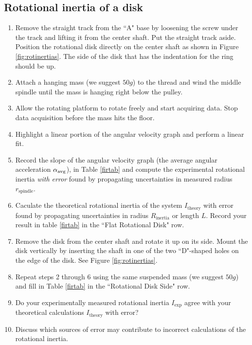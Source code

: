\subsection{Rotational inertia of a disk}

\label{diskinert}
\begin{enumerate}
	\item Remove the straight track from the ``A" base by loosening the screw under the track and lifting it from the center shaft.  Put the straight track aside.  Position the rotational disk directly on the center shaft as shown in Figure \ref{fig:rotinertias}.  The side of the disk that has the indentation for the ring should be up.
	\item Attach a hanging mass (we suggest $50g$) to the thread and wind the middle spindle until the mass is hanging right below the pulley.
	\item Allow the rotating platform to rotate freely and start acquiring data.  Stop data acquisition before the mass hits the floor.
	\item Highlight a linear portion of the angular velocity graph and perform a linear fit.
	\item Record the slope of the angular velocity graph (the average angular acceleration $\alpha _{\rm avg}$), in Table \ref{firtab} and compute the experimental rotational inertia {\it{with error}} found by propagating uncertainties in measured radius $r_\text{spindle}$.
\item Caculate the theoretical rotational inertia of the system $I_\text{theory}$ with error found by propagating uncertainties in radius $R_\text{inertia}$ or length $L$. Record your result in table \ref{firtab} in the ``Flat Rotational Disk" row.
	\item Remove the disk from the center shaft and rotate it up on its side.  Mount the disk vertically by inserting the shaft in one of the two ``D"-shaped holes on the edge of the disk.  See Figure \ref{fig:rotinertias}.
\item Repeat steps 2 through 6 using the same suspended mass (we suggest $50g$) and fill in Table \ref{firtab} in the ``Rotational Disk Side" row.
\item Do your experimentally measured rotational inertia $I_\text{exp}$ agree with your theoretical calculations $I_\text{theory}$ with error?
\item Discuss which sources of error may contribute to incorrect calculations of the rotational inertia.
\end{enumerate}

